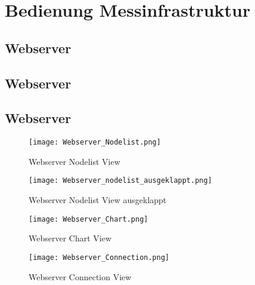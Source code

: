 

\newpage
\section{Bedienung Messinfrastruktur}\label{sec:BedienungMessinfrastruktur}


\subsection{Webserver}\label{sec:AufbauundBedienungderMessinfrastruktur}

\subsection{Webserver}\label{sec:AufbauundBedienungderMessinfrastruktur}

\subsection{Webserver}\label{sec:AufbauundBedienungderMessinfrastruktur}
\begin{figure} [H]
	\centering
	\texttt{[image: Webserver\_Nodelist.png]}
	\caption{Webserver Nodelist View}
	\label{fig:WebserverNodelistView}
\end{figure}

\begin{figure} [H]
	\centering
	\texttt{[image: Webserver\_nodelist\_ausgeklappt.png]}
	\caption{Webserver Nodelist View ausgeklappt}
	\label{fig:WebserverNodelistViewausgeklappt}
\end{figure}

\begin{figure} [H]
	\centering
	\texttt{[image: Webserver\_Chart.png]}
	\caption{Webserver Chart View}
	\label{fig:WebserverChartView}
\end{figure}

\begin{figure} [H]
	\centering
	\texttt{[image: Webserver\_Connection.png]}
	\caption{Webserver Connection View}
	\label{fig:WebserverConnectionView}
\end{figure}



